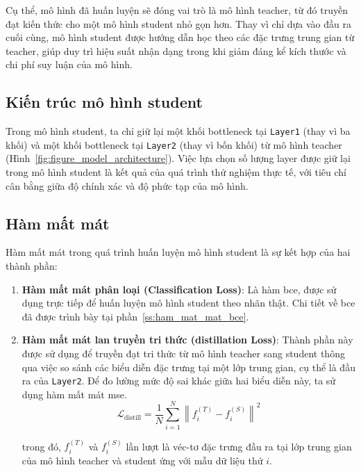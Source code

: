 Cụ thể, mô hình đã huấn luyện sẽ đóng vai trò là mô hình \gls{teacher}, từ đó truyền đạt kiến thức cho một mô hình \gls{student} nhỏ gọn hơn. Thay vì chỉ dựa vào đầu ra cuối cùng, mô hình \gls{student} được hướng dẫn học theo các đặc trưng trung gian từ \gls{teacher}, giúp duy trì hiệu suất nhận dạng trong khi giảm đáng kể kích thước và chi phí suy luận của mô hình.

\subsection{Kiến trúc mô hình \gls{student}}
%
%
Trong mô hình \gls{student}, ta chỉ giữ lại một khối \gls{bottleneck} tại \texttt{Layer1} (thay vì ba khối) và một khối \gls{bottleneck} tại \texttt{Layer2} (thay vì bốn khối) từ mô hình \gls{teacher} (Hình~\ref{fig:figure_model_architecture}).
%
Việc lựa chọn số lượng layer được giữ lại trong mô hình \gls{student} là kết quả của quá trình thử nghiệm thực tế, với tiêu chí cân bằng giữa độ chính xác và độ phức tạp của mô hình.
\subsection{Hàm mất mát}

Hàm mất mát trong quá trình huấn luyện mô hình \gls{student} là sự kết hợp của hai thành phần:

\begin{enumerate}
	\item \textbf{Hàm mất mát phân loại (Classification Loss)}:
	Là hàm \gls{bce}, được sử dụng trực tiếp để huấn luyện mô hình \gls{student} theo nhãn thật. Chi tiết về \gls{bce} đã được trình bày tại phần~\ref{ss:ham_mat_mat_bce}.
	\item \textbf{Hàm mất mát lan truyền tri thức (\Gls{distillation} Loss)}:
	Thành phần này được sử dụng để truyền đạt tri thức từ mô hình \gls{teacher} sang \gls{student} thông qua việc so sánh các biểu diễn đặc trưng tại một lớp trung gian, cụ thể là đầu ra của \texttt{Layer2}. Để đo lường mức độ sai khác giữa hai biểu diễn này, ta sử dụng hàm mất mát \gls{mse}.
	\begin{equation}
		\mathcal{L}_{\mathrm{distill}} = \frac{1}{N} \sum_{i=1}^{N} \left\| f^{(T)}_i - f^{(S)}_i \right\|^2
	\end{equation}
	
	trong đó, \( f^{(T)}_i \) và \( f^{(S)}_i \) lần lượt là véc-tơ đặc trưng đầu ra tại lớp trung gian của mô hình \gls{teacher} và \gls{student} ứng với mẫu dữ liệu thứ \( i \).
		
\end{enumerate}

